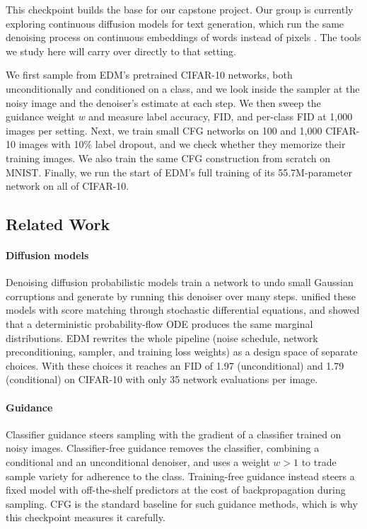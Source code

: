\documentclass[12pt,letterpaper]{article}
\begin{document}
This checkpoint builds the base for our capstone project.
Our group is currently exploring continuous diffusion models for text generation, which run the same denoising process on continuous embeddings of words instead of pixels \citep{li2022diffusionlm}.
The tools we study here will carry over directly to that setting.

We first sample from EDM's pretrained CIFAR-10 networks, both unconditionally and conditioned on a class, and we look inside the sampler at the noisy image and the denoiser's estimate at each step.
We then sweep the guidance weight \(w\) and measure label accuracy, FID, and per-class FID at 1,000 images per setting.
Next, we train small CFG networks on 100 and 1,000 CIFAR-10 images with 10\% label dropout, and we check whether they memorize their training images.
We also train the same CFG construction from scratch on MNIST.
Finally, we run the start of EDM's full training of its 55.7M-parameter network on all of CIFAR-10.

\subsection{Related Work}

\paragraph{Diffusion models}
Denoising diffusion probabilistic models \citep{ho2020ddpm} train a network to undo small Gaussian corruptions and generate by running this denoiser over many steps.
\cite{song2021scorebased} unified these models with score matching through stochastic differential equations, and showed that a deterministic probability-flow ODE produces the same marginal distributions.
EDM \citep{karras2022edm} rewrites the whole pipeline (noise schedule, network preconditioning, sampler, and training loss weights) as a design space of separate choices.
With these choices it reaches an FID of 1.97 (unconditional) and 1.79 (conditional) on CIFAR-10 with only 35 network evaluations per image.

\paragraph{Guidance}
Classifier guidance \citep{dhariwal2021diffusion} steers sampling with the gradient of a classifier trained on noisy images.
Classifier-free guidance \citep{ho2022cfg} removes the classifier, combining a conditional and an unconditional denoiser, and uses a weight \(w > 1\) to trade sample variety for adherence to the class.
Training-free guidance \citep{ye2024tfg} instead steers a fixed model with off-the-shelf predictors at the cost of backpropagation during sampling.
CFG is the standard baseline for such guidance methods, which is why this checkpoint measures it carefully.
\end{document}
